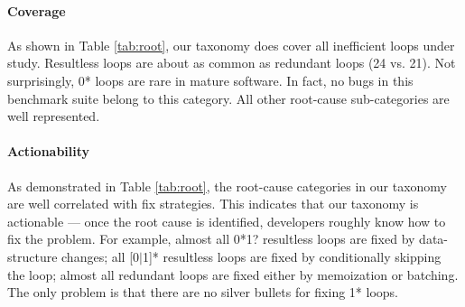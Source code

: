 

\paragraph{Coverage}
As shown in Table \ref{tab:root}, 
our taxonomy does cover all inefficient loops under study. 
Resultless loops are about as common as redundant loops
(24 vs. 21).
Not surprisingly, 0* loops
are rare in mature software. In fact, no bugs in this
benchmark suite belong to this category.
All other root-cause sub-categories are well represented.


\paragraph{Actionability}
As demonstrated in Table \ref{tab:root}, 
the root-cause categories in our taxonomy are well correlated with
fix strategies.
This indicates that our taxonomy is actionable --- once the root cause
is identified, developers roughly know how to fix the problem.
For example, 
almost all 0*1? resultless loops are fixed by data-structure changes;
all [0$|$1]* resultless loops are
fixed by conditionally skipping the loop;
almost all redundant loops are fixed either by 
memoization or batching. 
The only problem is that there are no silver bullets for fixing 1* loops.

